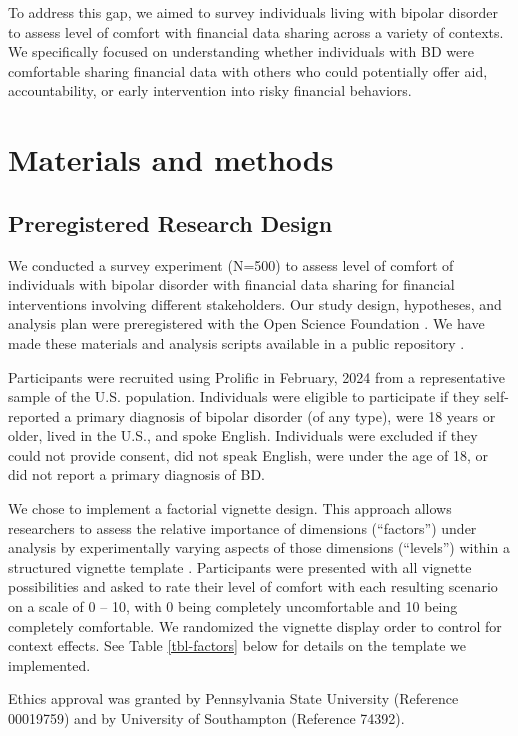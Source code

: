 \documentclass[10pt]{article}
\begin{document}
To address this gap, we aimed to survey individuals living with bipolar disorder to assess level of comfort with financial data sharing across a variety of contexts. We specifically focused on understanding whether individuals with BD were comfortable sharing financial data with others who could potentially offer aid, accountability, or early intervention into risky financial behaviors. 


\section{Materials and methods}

\subsection{Preregistered Research Design}

We conducted a survey experiment (N=500) to assess level of comfort of individuals with bipolar disorder with financial data sharing for financial interventions involving different stakeholders. Our study design, hypotheses, and analysis plan were preregistered with the Open Science Foundation \cite{foster2017open}. We have made these materials and analysis scripts available in a public repository \cite{brozenaidentifying2023}.

Participants were recruited using Prolific in February, 2024 from a representative sample of the U.S. population. Individuals were eligible to participate if they self-reported a primary diagnosis of bipolar disorder (of any type), were 18 years or older, lived in the U.S., and spoke English. Individuals were excluded if they could not provide consent, did not speak English, were under the age of 18, or did not report a primary diagnosis of BD.

We chose to implement a factorial vignette design. This approach allows researchers to assess the relative importance of dimensions (``factors'') under analysis by experimentally varying aspects of those dimensions (``levels'') within a structured vignette template \cite{auspurgfactorial2015}. Participants were presented with all vignette possibilities and asked to rate their level of comfort with each resulting scenario on a scale of 0 -- 10, with 0 being completely uncomfortable and 10 being completely comfortable. We randomized the vignette display order to control for context effects. See Table \ref{tbl-factors} below for details on the template we implemented.

Ethics approval was granted by Pennsylvania State University (Reference 00019759) and by University of Southampton (Reference 74392). 
\end{document}

